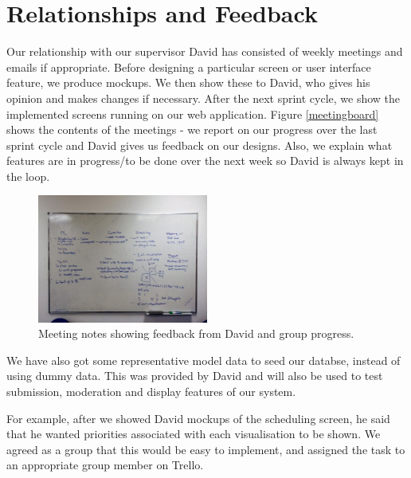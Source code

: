 \documentclass[a4paper]{article}
\begin{document}
\section{Relationships and Feedback}
Our relationship with our supervisor David has consisted of weekly 
meetings and emails if appropriate. Before designing a particular screen
or user interface feature, we produce mockups. We then show these to 
David, who gives his opinion and makes changes if necessary. After the next 
sprint cycle, we show the implemented screens running on our web application. Figure
\ref{meetingboard} shows the contents of the meetings - we report on our progress 
over the last sprint cycle and David gives us feedback on our designs. Also, we 
explain what features are in progress/to be done over the next week so David is 
always kept in the loop.

\begin{figure}[h!]
  \centering
    \includegraphics[width = 0.5\textwidth]{./evaluation/meeting-board.jpg}

  \caption{Meeting notes showing feedback from David and group progress.}
  \label{fig:meetingboard}
\end{figure}

We have also got some representative model data to seed our databse, 
instead of using dummy data. This was provided by David and will also be 
used to test submission, moderation and display features of our system.

For example, after we showed David mockups of the scheduling screen, he said that 
he wanted priorities associated with each visualisation to be shown. We agreed as a 
group that this would be easy to implement, and assigned the task to an appropriate
group member on Trello. 
\end{document}
